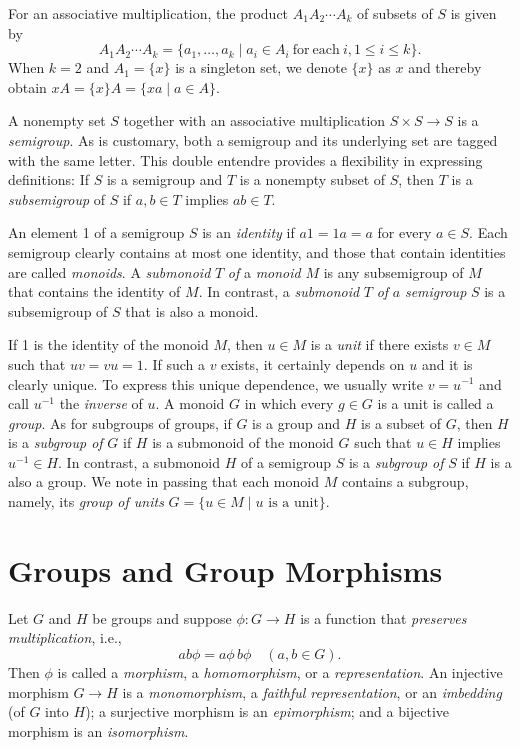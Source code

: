 \documentclass{surv-l}
\numberwithin{equation}{section}
\numberwithin{table}{section}
\numberwithin{figure}{section}
\theoremstyle{plain}
\theoremstyle{definition}
\begin{document}
For an associative multiplication, the product $A_{1}A_{2}\cdots
A_{k}$ of subsets of $S$ is given by
\[
A_{1}A_{2}\cdots A_{k}=\{a_{1},\ldots, a_{k}\mid a_{i}\in A_{i}\ \mathrm{for\
each}\ i, 1\leq i\leq k\}.
\]
When $k=2$ and $A_{1}=\{x\}$ is a singleton set, we denote $\{x\}$
as $x$ and thereby obtain $xA=\{x\}A=\{xa\mid a\in A\}$.

A nonempty set $S$ together with an associative multiplication
$S\times S\rightarrow S$ is a \emph{semigroup}. As is customary,
both a semigroup and its underlying set are tagged with the same
letter. This double entendre provides a flexibility in expressing
definitions: If $S$ is a semigroup and $T$ is a nonempty subset of
$S$, then $T$ is a \emph{subsemigroup} of $S$ if $a, b\in T$
implies $ ab\in T$.

An element 1 of a semigroup $S$ is an
\emph{identity} if $a1 = 1a = a$
for every $a\in S$. Each semigroup clearly contains at most one
identity, and those that contain identities are called
\emph{monoids}. A \emph{submonoid} $T$ \emph{of} a
\emph{monoid} $M$ is any subsemigroup of $M$ that contains the
identity of $M$. In contrast, a \emph{submonoid} $T$ \emph{of} $a$
\emph{semigroup} $S$ is a subsemigroup of $S$ that is also a
monoid.

If 1 is the identity of the monoid $M$, then $u\in M$ is a
\emph{unit} if there exists $v\in M$ such that $uv= vu =1$. If
such a $v$ exists, it certainly depends on $u$ and it is clearly
unique. To express this unique dependence, we usually write
$v=u^{-1}$ and call $u^{-1}$ the \emph{inverse} of $u$. A monoid
$G$ in which every $g\in G$ is a unit is called a
\emph{group}. As for subgroups of groups,
if $G$ is a group and $H$ is a subset of $G$, then $H$ is a
\emph{subgroup of} $G$ if $H$ is a submonoid of the monoid $G$
such that $u\in H$ implies $ u^{-1}\in H$. In contrast, a
submonoid $H$ of a semigroup $S$ is a \emph{subgroup of} $S$ if
$H$ is a also a group. We note in
passing that each monoid $M$ contains a subgroup, namely, its
\emph{group of units} $G=\{u\in M\mid
u\text{ is a unit}\}$.

\section{Groups and Group Morphisms}\label{secA.71}

Let $G$ and $H$ be groups and suppose $\phi : G\rightarrow H$ is a
function that \emph{preserves multiplication}, i.e.,
\[
 ab\phi=a\phi\, b\phi\quad (a, b\in G).
\]
Then $\phi$ is called a \emph{morphism}, a
\emph{homomorphism}, or a
\emph{representation}. An injective morphism $G\rightarrow H$ is a
\emph{monomorphism},\index{monomorphism} a \emph{faithful
representation}, or an
\emph{imbedding} (of $G$ into $H$); a surjective
morphism is an \emph{epimorphism}\index{epimorphism}; and a
bijective morphism is an \emph{isomorphism}.
\end{document}
